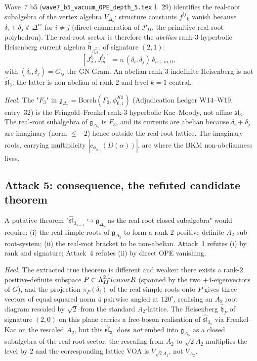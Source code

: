 \documentclass[12pt]{article}
\providecommand{\gDelta}{\mathfrak{g}_{\Delta_5}}
\providecommand{\slhat}[1]{\widehat{\mathfrak{sl}}_{#1}}
\providecommand{\sl}[1]{\mathfrak{sl}_{#1}}
\providecommand{\LambII}{\Lambda^{2,1}_{II}}
\providecommand{\FF}{F_3}
\begin{document}
Wave~7 b5 (\texttt{wave7\_b5\_vacuum\_OPE\_depth\_5.tex} l.~29)
identifies the real-root subalgebra of the vertex algebra
$V_{\Delta_5}$: structure constants $f^{ij}{}_k$ vanish because
$\delta_i + \delta_j \notin \Delta^{\mathrm{re}}$ for $i \neq
j$ (direct enumeration of $\mathcal{P}_{II}$, the primitive
real-root polyhedron). The real-root sector is therefore the
\emph{abelian} rank-$3$ hyperbolic Heisenberg current algebra
$\widehat{\mathfrak{h}}_{\LambII}$ of signature $(2,1)$:
\[
  [J^{\delta_i}_n, J^{\delta_j}_m] = n\,(\delta_i,\delta_j)\,\delta_{n+m,0},
\]
with $(\delta_i,\delta_j) = G_{ij}$ the GN Gram. An abelian
rank-$3$ indefinite Heisenberg is not $\slhat{3}$: the latter
is non-abelian of rank $2$ and level $k = 1$ central.

\emph{Heal.} The "$\FF$" in
$\gDelta = \mathrm{Borch}(\FF, \phi_{0,1}^{K3})$
(Adjudication Ledger W14--W19, entry~32) is the
Feingold--Frenkel rank-$3$ hyperbolic Kac--Moody, not affine
$\sl{3}$. The real-root subalgebra of $\gDelta$ is $\FF$, and
its currents are abelian because $\delta_i + \delta_j$ are
imaginary (norm $\leq -2$) hence outside the real-root lattice.
The imaginary roots, carrying multiplicity $|c_{\phi_{0,1}}
(D(\alpha))|$, are where the BKM non-abelianness lives.

\subsection*{Attack 5: consequence, the refuted candidate theorem}

A putative theorem "$\slhat{3}_{k=1} \hookrightarrow \gDelta$
as the real-root closed subalgebra" would require:
(i) the real simple roots of $\gDelta$ to form a rank-$2$
positive-definite $A_2$ sub-root-system; (ii) the real-root
bracket to be non-abelian. Attack~1 refutes (i) by rank and
signature; Attack~4 refutes (ii) by direct OPE vanishing.

\emph{Heal.} The extracted true theorem is different and
weaker: there exists a rank-$2$ positive-definite subspace
$P \subset \LambII \otimes \R$ (spanned by the two
$+4$-eigenvectors of $G$), and the projection
$\pi_P(\delta_i)$ of the real simple roots onto $P$ gives
three vectors of equal squared norm $4$ pairwise angled at
$120^\circ$, realising an $A_2$ root diagram rescaled by
$\sqrt{2}$ from the standard $A_2$-lattice. The Heisenberg
$\widehat{\mathfrak{h}}_{P}$ of signature $(2,0)$ on this
plane carries a free-boson realisation of $\slhat{3}_1$ via
Frenkel--Kac on the rescaled $A_2$, but this $\slhat{3}_1$
does \emph{not} embed into $\gDelta$ as a closed subalgebra
of the real-root sector: the rescaling from $A_2$ to
$\sqrt{2} A_2$ multiplies the level by $2$ and the
corresponding lattice VOA is $V_{\sqrt{2}A_2}$, not
$V_{A_2}$.
\end{document}
